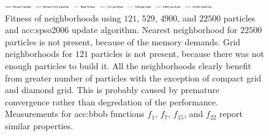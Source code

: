 \begin{figure}[ht!]
    \begin{minipage}{\textwidth}
        \centering
        \includegraphics[width=0.8\textwidth]{img/runs/fitness_pso_neigh_legend.pdf}
    \end{minipage}

    \caption[PSO neighborhood fitness]{Fitness of neighborhoods using $121$, $529$, $4900$, and $22500$ particles and \acrshort{acc:spso2006} update algorithm. Nearest neighborhood for $22500$ particles is not present, because of the memory demands. Grid neighborhoods for $121$ particles is not present, because there was not enough particles to build it. 
    All the neighborhoods clearly benefit from greater number of particles with the exception of compact grid and diamond grid. This is probably caused by premature convergence rather than degredation of the performance.
    Measurements for \acrshort{acc:bbob} functions $f_1$, $f_7$, $f_{15}$, and $f_{22}$ report similar properties.}
\end{figure}




